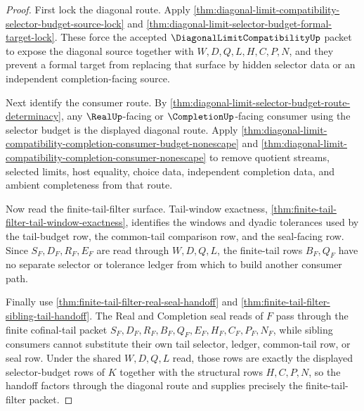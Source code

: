 \begin{proof}
First lock the diagonal route. Apply \autoref{thm:diagonal-limit-compatibility-selector-budget-source-lock} and \autoref{thm:diagonal-limit-selector-budget-formal-target-lock}. These force the accepted $\DiagonalLimitCompatibilityUp$ packet to expose the diagonal source together with $W,D,Q,L,H,C,P,N$, and they prevent a formal target from replacing that surface by hidden selector data or an independent completion-facing source.

Next identify the consumer route. By \autoref{thm:diagonal-limit-selector-budget-route-determinacy}, any $\RealUp$-facing or $\CompletionUp$-facing consumer using the selector budget is the displayed diagonal route. Apply \autoref{thm:diagonal-limit-compatibility-completion-consumer-budget-nonescape} and \autoref{thm:diagonal-limit-compatibility-completion-consumer-nonescape} to remove quotient streams, selected limits, host equality, choice data, independent completion data, and ambient completeness from that route.

Now read the finite-tail-filter surface. Tail-window exactness, \autoref{thm:finite-tail-filter-tail-window-exactness}, identifies the windows and dyadic tolerances used by the tail-budget row, the common-tail comparison row, and the seal-facing row. Since $S_F,D_F,R_F,E_F$ are read through $W,D,Q,L$, the finite-tail rows $B_F,Q_F$ have no separate selector or tolerance ledger from which to build another consumer path.

Finally use \autoref{thm:finite-tail-filter-real-seal-handoff} and \autoref{thm:finite-tail-filter-sibling-tail-handoff}. The Real and Completion seal reads of $F$ pass through the finite cofinal-tail packet $S_F,D_F,R_F,B_F,Q_F,E_F,H_F,C_F,P_F,N_F$, while sibling consumers cannot substitute their own tail selector, ledger, common-tail row, or seal row. Under the shared $W,D,Q,L$ read, those rows are exactly the displayed selector-budget rows of $K$ together with the structural rows $H,C,P,N$, so the handoff factors through the diagonal route and supplies precisely the finite-tail-filter packet.
\end{proof}

